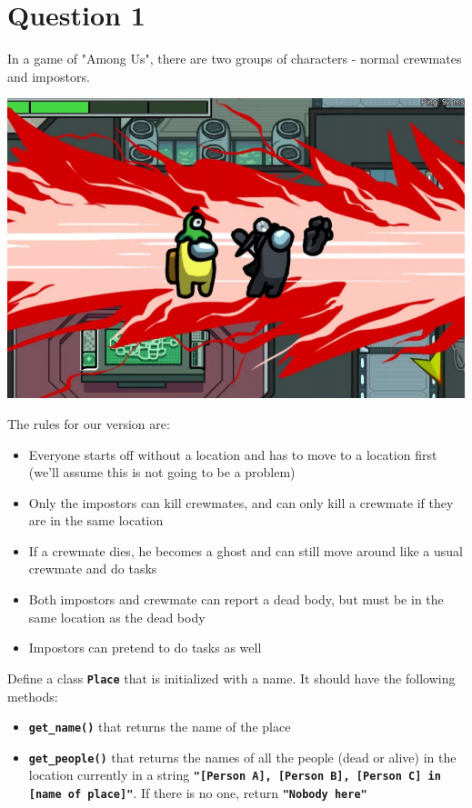 \section{Question 1}
In a game of "Among Us", there are two groups of characters - normal crewmates and
impostors. \\
\begin{center}
\includegraphics[scale=0.7]{amogus.png}
\end{center}
The rules for our version are:
\begin{itemize}
    \item Everyone starts off without a location and has to move to a location first (we'll assume
    this is not going to be a problem)
    \item Only the impostors can kill crewmates, and can only kill a crewmate if they are in the
    same location
    \item If a crewmate dies, he becomes a ghost and can still move around like a usual crewmate
    and do tasks
    \item Both impostors and crewmate can report a dead body, but must be in the same location
    as the dead body
    \item Impostors can pretend to do tasks as well
\end{itemize}

Define a class \texttt{\bfseries Place} that is initialized with a name. It should have the following methods:
\begin{itemize}
\item \texttt{\bfseries get\_name()} that returns the name of the place
\item \texttt{\bfseries get\_people()} that returns the names of all the people (dead or alive) in the
location currently in a string \texttt{\bfseries "[Person A], [Person B], [Person C] in
[name of place]"}. If there is no one, return \texttt{\bfseries "Nobody here"}
\end{itemize}

